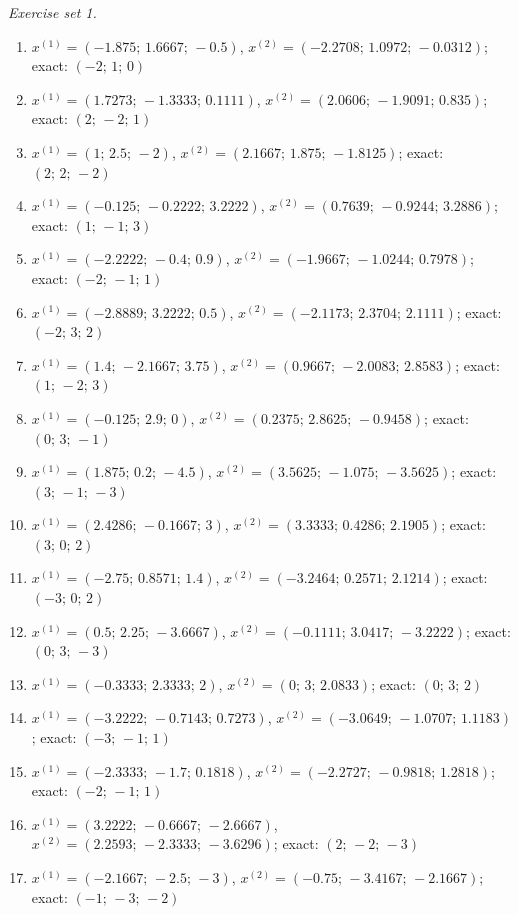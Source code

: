 \par\noindent\emph{Exercise set 1.}\nopagebreak
\begin{enumerate}[label=\arabic*., leftmargin=*, itemsep=1pt]
\item $x^{(1)}=(-1.875;\,1.6667;\,-0.5)$, $x^{(2)}=(-2.2708;\,1.0972;\,-0.0312)$; exact: $(-2;\,1;\,0)$
\item $x^{(1)}=(1.7273;\,-1.3333;\,0.1111)$, $x^{(2)}=(2.0606;\,-1.9091;\,0.835)$; exact: $(2;\,-2;\,1)$
\item $x^{(1)}=(1;\,2.5;\,-2)$, $x^{(2)}=(2.1667;\,1.875;\,-1.8125)$; exact: $(2;\,2;\,-2)$
\item $x^{(1)}=(-0.125;\,-0.2222;\,3.2222)$, $x^{(2)}=(0.7639;\,-0.9244;\,3.2886)$; exact: $(1;\,-1;\,3)$
\item $x^{(1)}=(-2.2222;\,-0.4;\,0.9)$, $x^{(2)}=(-1.9667;\,-1.0244;\,0.7978)$; exact: $(-2;\,-1;\,1)$
\item $x^{(1)}=(-2.8889;\,3.2222;\,0.5)$, $x^{(2)}=(-2.1173;\,2.3704;\,2.1111)$; exact: $(-2;\,3;\,2)$
\item $x^{(1)}=(1.4;\,-2.1667;\,3.75)$, $x^{(2)}=(0.9667;\,-2.0083;\,2.8583)$; exact: $(1;\,-2;\,3)$
\item $x^{(1)}=(-0.125;\,2.9;\,0)$, $x^{(2)}=(0.2375;\,2.8625;\,-0.9458)$; exact: $(0;\,3;\,-1)$
\item $x^{(1)}=(1.875;\,0.2;\,-4.5)$, $x^{(2)}=(3.5625;\,-1.075;\,-3.5625)$; exact: $(3;\,-1;\,-3)$
\item $x^{(1)}=(2.4286;\,-0.1667;\,3)$, $x^{(2)}=(3.3333;\,0.4286;\,2.1905)$; exact: $(3;\,0;\,2)$
\item $x^{(1)}=(-2.75;\,0.8571;\,1.4)$, $x^{(2)}=(-3.2464;\,0.2571;\,2.1214)$; exact: $(-3;\,0;\,2)$
\item $x^{(1)}=(0.5;\,2.25;\,-3.6667)$, $x^{(2)}=(-0.1111;\,3.0417;\,-3.2222)$; exact: $(0;\,3;\,-3)$
\item $x^{(1)}=(-0.3333;\,2.3333;\,2)$, $x^{(2)}=(0;\,3;\,2.0833)$; exact: $(0;\,3;\,2)$
\item $x^{(1)}=(-3.2222;\,-0.7143;\,0.7273)$, $x^{(2)}=(-3.0649;\,-1.0707;\,1.1183)$; exact: $(-3;\,-1;\,1)$
\item $x^{(1)}=(-2.3333;\,-1.7;\,0.1818)$, $x^{(2)}=(-2.2727;\,-0.9818;\,1.2818)$; exact: $(-2;\,-1;\,1)$
\item $x^{(1)}=(3.2222;\,-0.6667;\,-2.6667)$, $x^{(2)}=(2.2593;\,-2.3333;\,-3.6296)$; exact: $(2;\,-2;\,-3)$
\item $x^{(1)}=(-2.1667;\,-2.5;\,-3)$, $x^{(2)}=(-0.75;\,-3.4167;\,-2.1667)$; exact: $(-1;\,-3;\,-2)$

\end{enumerate}
